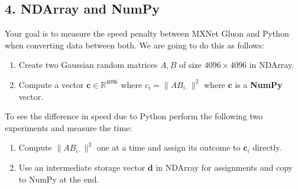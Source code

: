 \documentclass[11pt]{article}
\providecommand{\tightlist}{%
      \setlength{\itemsep}{0pt}\setlength{\parskip}{0pt}}
\begin{document}
    \hypertarget{ndarray-and-numpy}{%
\subsection{4. NDArray and NumPy}\label{ndarray-and-numpy}}

Your goal is to measure the speed penalty between MXNet Gluon and Python
when converting data between both. We are going to do this as follows:

\begin{enumerate}
\def\labelenumi{\arabic{enumi}.}
\tightlist
\item
  Create two Gaussian random matrices \(A, B\) of size
  \(4096 \times 4096\) in NDArray.
\item
  Compute a vector \(\mathbf{c} \in \mathbb{R}^{4096}\) where
  \(c_i = \|A B_{i\cdot}\|^2\) where \(\mathbf{c}\) is a \textbf{NumPy}
  vector.
\end{enumerate}

To see the difference in speed due to Python perform the following two
experiments and measure the time:

\begin{enumerate}
\def\labelenumi{\arabic{enumi}.}
\tightlist
\item
  Compute \(\|A B_{i\cdot}\|^2\) one at a time and assign its outcome to
  \(\mathbf{c}_i\) directly.
\item
  Use an intermediate storage vector \(\mathbf{d}\) in NDArray for
  assignments and copy to NumPy at the end.
\end{enumerate}
\end{document}
